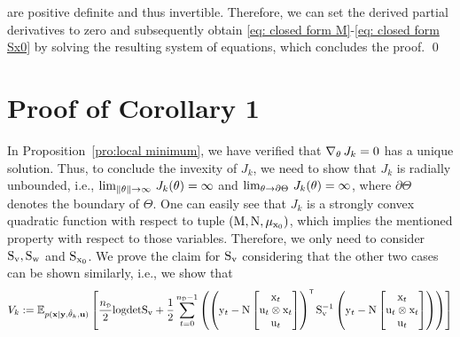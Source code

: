 are positive definite and thus invertible. Therefore, we can set the derived partial derivatives to zero and subsequently obtain \eqref{eq: closed form M}-\eqref{eq: closed form Sx0} by solving the resulting system of equations, which concludes the proof.
\qed
\section{Proof of Corollary 1}\label{app:Proof of Corollary 1}
In Proposition~\ref{pro:local minimum}, we have verified that $\nabla_{ \mathrm{\theta} } \,  J_k = 0$ has a unique solution. Thus, to conclude the invexity of $J_k$, we need to show that $J_k$ is radially unbounded, i.e., $\lim_{\|{ \mathrm{\theta} }\|\to\infty} \, J_k({ \mathrm{\theta} }) = \infty$ and $\lim_{{ \mathrm{\theta} }\to\partial\Theta} \, J_k({ \mathrm{\theta} }) = \infty$, where $\partial\Theta$ denotes the boundary of $\Theta$.
%
%
One can easily see that $J_k$ is a strongly convex quadratic function with respect to tuple $({ \mathrm{M} },{ \mathrm{N} },\mu_{{ \mathrm{x} }_0})$, 
which implies the mentioned property with respect to those variables. Therefore, we only need to consider ${ \mathrm{S} }_{ \mathrm{v} }, { \mathrm{S} }_{ \mathrm{w} }$ and ${ \mathrm{S} }_{{ \mathrm{x} }_0}$. We prove the claim for ${ \mathrm{S} }_{ \mathrm{v} }$ considering that the other two cases can be shown similarly, i.e., we show that
\begin{equation}
\begin{split}
    V_k := \mathbb{E}_{p(\mathbf{x}|\mathbf{y},\hat{\vctheta}_k,\mathbf{u})} \left[\frac{\nD}{2}\logdet\mxS_\vcv  +\frac{1}{2}\sum_{t=0}^{\nD-1} \left( \left(\vcy_t - \mxN \begin{bmatrix} \vcx_t\\ \vcu_t \otimes \vcx_t \\ \vcu_t\end{bmatrix}\right)^\tr \mxS_\vcv^{-1}
     \left( \vcy_t -  \mxN \begin{bmatrix} \vcx_t\\ \vcu_t \otimes \vcx_t \\ \vcu_t\end{bmatrix}\right) \right)\right]
\end{split}
\end{equation}
